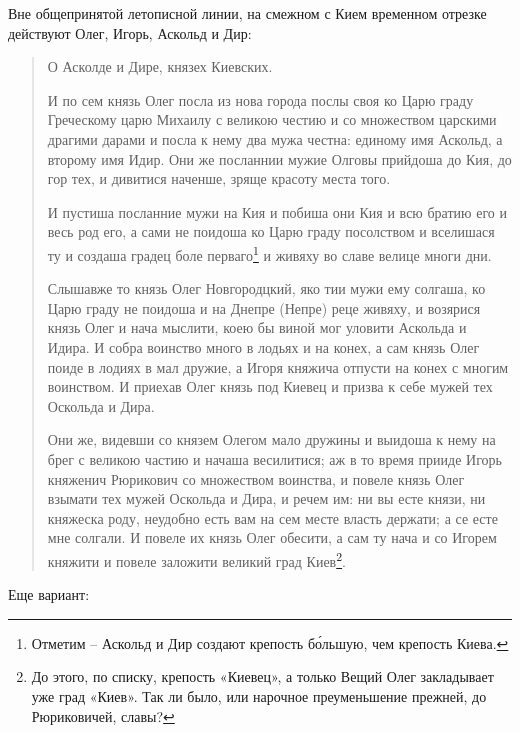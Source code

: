 Вне общепринятой летописной линии, на смежном с Кием временном отрезке действуют Олег, Игорь, Аскольд и Дир:

\begin{quotation}
О Асколде и Дире, князех Киевских.

И по сем князь Олег посла из нова города послы своя ко Царю граду Греческому царю Михаилу с великою честию и со множеством царскими драгими дарами и посла к нему два мужа честна: единому имя Аскольд, а второму имя Идир. Они же посланнии мужие Олговы прийдоша до Кия, до гор тех, и дивитися наченше, зряще красоту места того. 

И пустиша посланние мужи на Кия и побиша они Кия и всю братию его и весь род его, а сами не поидоша ко Царю граду посолством и вселишася ту и создаша градец боле перваго\footnote{Отметим – Аскольд и Дир создают крепость б\'ольшую, чем крепость Киева.} и живяху во славе велице многи дни.

Слышавже то князь Олег Новгородцкий, яко тии мужи ему солгаша, ко Царю граду не поидоша и на Днепре (Непре) реце живяху, и возярися князь Олег и нача мыслити, коею бы виной мог уловити Аскольда и Идира. И собра воинство много в лодьях и на конех, а сам князь Олег поиде в лодиях в мал дружие, а Игоря княжича отпусти на конех с многим воинством. И приехав Олег князь под Киевец и призва к себе мужей тех Оскольда и Дира.

Они же, видевши со князем Олегом мало дружины и выидоша к нему на брег с великою частию и начаша весилитися; аж в то время прииде Игорь княженич Рюрикович со  множеством воинства, и повеле князь Олег взымати тех мужей Оскольда и Дира, и речем им: ни вы есте князи, ни княжеска роду, неудобно есть вам на сем месте власть держати; а се есте мне солгали. И повеле их князь Олег обесити, а сам ту нача и со Игорем княжити и повеле заложити великий град Киев\footnote{До этого, по списку, крепость «Киевец», а только Вещий Олег закладывает уже град «Киев». Так ли было, или нарочное преуменьшение прежней, до Рюриковичей, славы?}.
\end{quotation}

Еще вариант:

